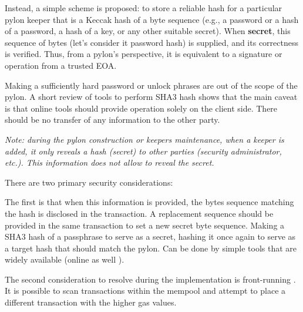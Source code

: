 \documentclass[12pt]{article}
\begin{document}
\medskip
Instead, a simple scheme is proposed: to store a reliable hash for a particular pylon keeper that is a Keccak hash of a byte sequence (e.g., a password or a hash of a password, a hash of a key, or any other suitable secret). When \textbf{secret}, this sequence of bytes (let’s consider it password hash) is supplied, and its correctness is verified. Thus, from a pylon’s perspective, it is equivalent to a signature or operation from a trusted EOA.

Making a sufficiently hard password or unlock phrases are out of the scope of the pylon. A short review of tools to perform SHA3 hash shows that the main caveat is that online tools should provide operation solely on the client side. There should be no transfer of any information to the other party.

\smallskip
\emph{Note: during the pylon construction or keepers maintenance, when a keeper is added, it only reveals a hash (secret) to other parties (security administrator, etc.). This information does not allow to reveal the secret.}

\medskip
There are two primary security considerations:

\smallskip
The first is that when this information is provided, the bytes sequence matching the hash is disclosed in the transaction. A replacement sequence should be provided in the same transaction to set a new secret byte sequence. Making a SHA3 hash of a passphrase to serve as a secret, hashing it once again to serve as a target hash that should match the pylon. Can be done by simple tools that are widely available (online as well \cite{OnlineHashTool}).

\smallskip
The second consideration to resolve during the implementation is front-running \cite{FrontRunning}. It is possible to scan transactions within the mempool and attempt to place a different transaction with the higher gas values.
\end{document}
